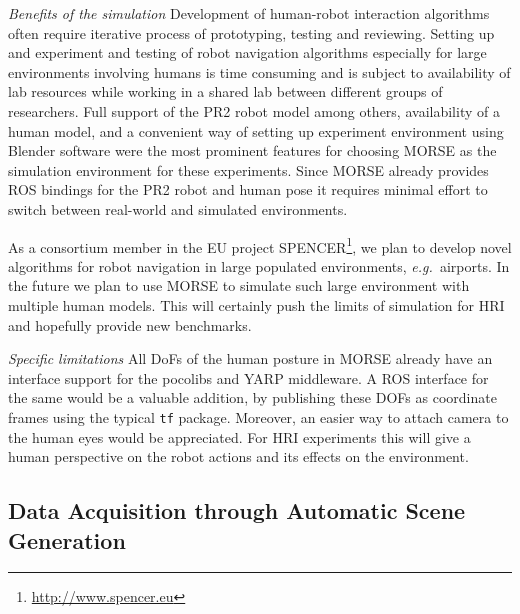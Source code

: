 \documentclass[letterpaper, 10pt, conference]{ieeeconf}
\newcommand{\eg}{{\textit{e.g.~}}}
\begin{document}
\emph{Benefits of the simulation} Development of human-robot interaction
algorithms often require iterative process of prototyping, testing and
reviewing. Setting up and experiment and testing of robot navigation algorithms
especially for large environments involving humans is time consuming and is
subject to availability of lab resources while working in a shared lab between
different groups of researchers. Full support of the PR2 robot model among
others, availability of a human model, and a convenient way of setting up
experiment environment using Blender software were the most prominent features
for choosing MORSE as the simulation environment for these experiments. Since
MORSE already provides ROS bindings for the PR2 robot and human pose it requires
minimal effort to switch between real-world and simulated environments.

As a consortium member in the EU project
SPENCER\footnote{\url{http://www.spencer.eu}}, we plan to develop novel
algorithms for robot navigation in large populated environments, \eg airports.
In the future we plan to use MORSE to simulate such large environment with
multiple human models. This will certainly push the limits of simulation for HRI
and hopefully provide new benchmarks.

\emph{Specific limitations} All DoFs of the human posture in MORSE already have an
interface support for the {\sc pocolibs} and YARP middleware. A ROS interface
for the same would be a valuable addition, by publishing these DOFs
as coordinate frames using the typical {\tt tf} package. Moreover, an easier
way to attach camera to the human eyes would be appreciated. For HRI experiments
this will give a human perspective on the robot actions and its effects on the
environment.


\subsection{Data Acquisition through Automatic Scene Generation}
\label{sc:generation}
\end{document}
